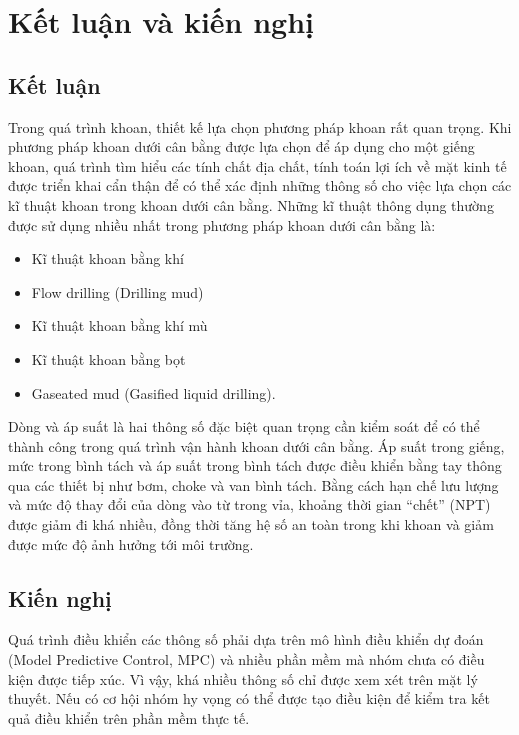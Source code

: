 \documentclass[12pt,a4paper]{article}
\begin{document}
\section{Kết luận và kiến nghị}
\subsection{Kết luận}
Trong quá trình khoan, thiết kế lựa chọn phương pháp khoan rất quan trọng. Khi phương pháp khoan dưới cân bằng được lựa chọn để áp dụng cho một giếng khoan, quá trình tìm hiểu các tính chất địa chất, tính toán lợi ích về mặt kinh tế được triển khai cẩn thận để có thể xác định những thông số cho việc lựa chọn các kĩ thuật khoan trong khoan dưới cân bằng. Những kĩ thuật thông dụng thường được sử dụng nhiều nhất trong phương pháp khoan dưới cân bằng là:
	\begin{itemize}
		\item Kĩ thuật khoan bằng khí
		\item Flow drilling (Drilling mud)
		\item Kĩ thuật khoan bằng khí mù
		\item Kĩ thuật khoan bằng bọt
		\item Gaseated mud (Gasified liquid drilling).
	\end{itemize}
Dòng và áp suất là hai thông số đặc biệt quan trọng cần kiểm soát để có thể thành công trong quá trình vận hành khoan dưới cân bằng. Áp suất trong giếng, mức trong bình tách và áp suất trong bình tách được điều khiển bằng tay thông qua các thiết bị như bơm, choke và van bình tách. Bằng cách hạn chế lưu lượng và mức độ thay đổi của dòng vào từ trong vỉa, khoảng thời gian ``chết'' (NPT) được giảm đi khá nhiều, đồng thời tăng hệ số an toàn trong khi khoan và giảm được mức độ ảnh hưởng tới môi trường.
\subsection{Kiến nghị}
Quá trình điều khiển các thông số phải dựa trên mô hình điều khiển dự đoán (Model Predictive Control, MPC) và nhiều phần mềm mà nhóm chưa có điều kiện được tiếp xúc. Vì vậy, khá nhiều thông số chỉ được xem xét trên mặt lý thuyết. Nếu có cơ hội nhóm hy vọng có thể được tạo điều kiện để kiểm tra kết quả điều khiển trên phần mềm thực tế.
\newpage


\end{document}
